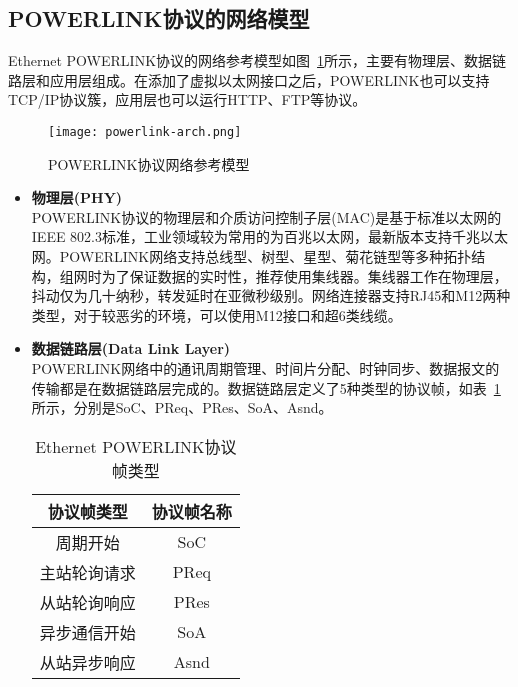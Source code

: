 \subsection{POWERLINK协议的网络模型}
\label{subsection:POWERLINK协议的网络模型}

Ethernet POWERLINK协议的网络参考模型如图~\ref{fig:powerlink-arch}所示，主要有物理层、数据链路层和应用层组成。在添加了虚拟以太网接口之后，POWERLINK也可以支持TCP/IP协议簇，应用层也可以运行HTTP、FTP等协议。

\begin{figure}[!htb]
  \centering
  \texttt{[image: powerlink-arch.png]}
  \caption{POWERLINK协议网络参考模型}
  \label{fig:powerlink-arch}
\end{figure}

\begin{itemize}
\item \textbf{物理层(PHY)} \\ 
POWERLINK协议的物理层和介质访问控制子层(MAC)是基于标准以太网的IEEE 802.3标准，工业领域较为常用的为百兆以太网，最新版本支持千兆以太网。POWERLINK网络支持总线型、树型、星型、菊花链型等多种拓扑结构，组网时为了保证数据的实时性，推荐使用集线器。集线器工作在物理层，抖动仅为几十纳秒，转发延时在亚微秒级别。网络连接器支持RJ45和M12两种类型，对于较恶劣的环境，可以使用M12接口和超6类线缆。

\item \textbf{数据链路层(Data Link Layer)} \\ 
POWERLINK网络中的通讯周期管理、时间片分配、时钟同步、数据报文的传输都是在数据链路层完成的。数据链路层定义了5种类型的协议帧，如表~\ref{table:2.2}所示，分别是SoC、PReq、PRes、SoA、Asnd。

\begin{table}[hbt]
  \centering
  \caption{Ethernet POWERLINK协议帧类型}
  \label{table:2.2}
  \setlength{\tabcolsep}{15mm}
  \begin{tabular}{cc}
    \toprule

     协议帧类型 & 协议帧名称\\
    \midrule
    周期开始 & SoC\\
    
    主站轮询请求 & PReq\\
    
    从站轮询响应 & PRes\\
    
    异步通信开始  & SoA\\
    
    从站异步响应  & Asnd\\              
    \bottomrule
  \end{tabular}


\end{table}
\end{itemize}
